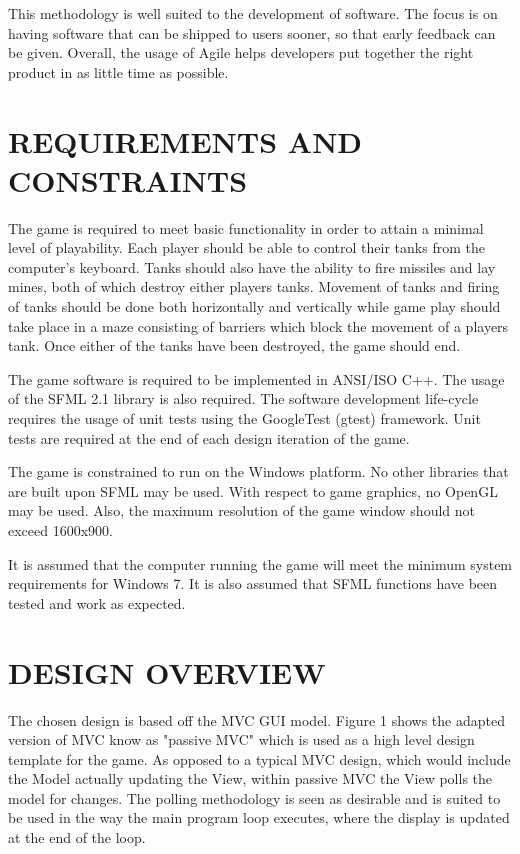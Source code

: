 \documentclass[10pt,twocolumn]{witseiepaper}
\begin{document}
This methodology is well suited to the development of software. The focus is on having software that can be shipped to users sooner, so that early feedback can be given. Overall, the usage of Agile helps developers put together the right product in as little time as possible.

%
\section{REQUIREMENTS AND CONSTRAINTS}%
The game is required to meet basic functionality in order to attain a minimal level of playability. Each player should be able to control their tanks from the computer's keyboard. Tanks should also have the ability to fire missiles and lay mines, both of which destroy either players tanks. Movement of tanks and firing of tanks should be done both horizontally and vertically while game play should take place in a maze consisting of barriers which block the movement of a players tank. Once either of the tanks have been destroyed, the game should end.

The game software is required to be implemented in ANSI/ISO C++. The usage of the SFML 2.1 library is also required. The software development life-cycle requires the usage of unit tests using the GoogleTest (gtest) framework. Unit tests are required at the end of each design iteration of the game.

The game is constrained to run on the Windows platform. No other libraries that are built upon SFML may be used. With respect to game graphics, no OpenGL may be used. Also, the maximum resolution of the game window should not exceed 1600x900. 

It is assumed that the computer running the game will meet the minimum system requirements for Windows 7. It is also assumed that SFML functions have been tested and work as expected.

%
\section{DESIGN OVERVIEW} %
The chosen design is based off the MVC GUI model. Figure 1 shows the adapted version of MVC know as "passive MVC" which is used as a high level design template for the game. As opposed to a typical MVC design, which would include the Model actually updating the View, within passive MVC the View polls the model for changes. The polling methodology is seen as desirable and is suited to be used in the way the main program loop executes, where the display is updated at the end of the loop. 
\end{document}

